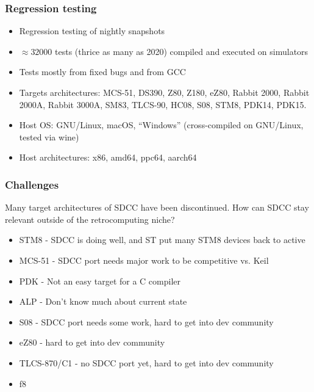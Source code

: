 \documentclass[xcolor=dvipsnames]{beamer}
\begin{document}
\begin{frame}
	\frametitle{Regression testing}
	\begin{itemize}
		\item Regression testing of nightly snapshots
		\item $\approx 32000$ tests (thrice as many as 2020) compiled and executed on simulators
		\item Tests mostly from fixed bugs and from GCC
		\item Targets architectures: MCS-51, DS390, Z80, Z180, eZ80, Rabbit 2000, Rabbit 2000A, Rabbit 3000A, SM83, TLCS-90, HC08, S08, STM8, PDK14, PDK15. 
		\item Host OS: GNU/Linux, macOS, ``Windows'' (cross-compiled on GNU/Linux, tested via wine)
		\item Host architectures: x86, amd64, ppc64, aarch64
	\end{itemize}
\end{frame}

\begin{frame}
	\frametitle{Challenges}
	Many target architectures of SDCC have been discontinued. How can SDCC stay relevant outside of the retrocomputing niche?
	\begin{itemize}
		\item STM8 - SDCC is doing well, and ST put many STM8 devices back to active
		\item MCS-51 - SDCC port needs major work to be competitive vs. Keil
		\item PDK - Not an easy target for a C compiler
		\item ALP - Don't know much about current state
		\item S08 - SDCC port needs some work, hard to get into dev community
		\item eZ80 - hard to get into dev community
		\item TLCS-870/C1 - no SDCC port yet, hard to get into dev community
		\item f8
	\end{itemize}
\end{frame}
\end{document}
